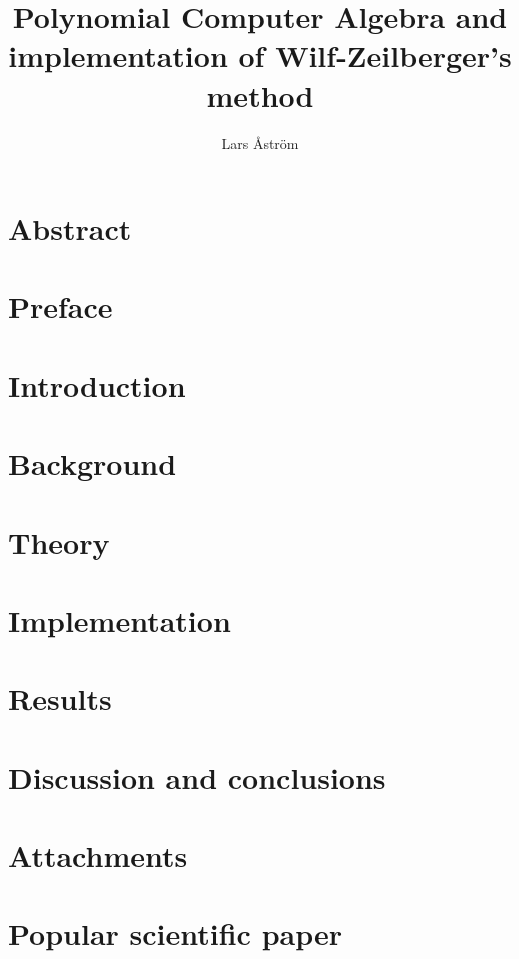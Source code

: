 \documentclass{LTHthesis}
\theoremstyle{definition}
\begin{document}
\begin{titlepages}
\author{Lars Åström}
\title{Polynomial Computer Algebra and implementation of Wilf-Zeilberger's method}
\end{titlepages}
\chapter*{Abstract}

\chapter*{Preface}

\tableofcontents

\chapter{Introduction}\label{Ch: Introduction}


\chapter{Background}\label{Ch: Background}


\chapter{Theory}\label{Ch: Theory}


\chapter{Implementation}\label{Ch: Implementation}


\chapter{Results}\label{Ch: Results}


\chapter{Discussion and conclusions}\label{Ch: Discussion and conclusions}


\begin{thebibliography}{99}

\end{thebibliography}

\chapter{Attachments}


\chapter{Popular scientific paper}

\end{document}
